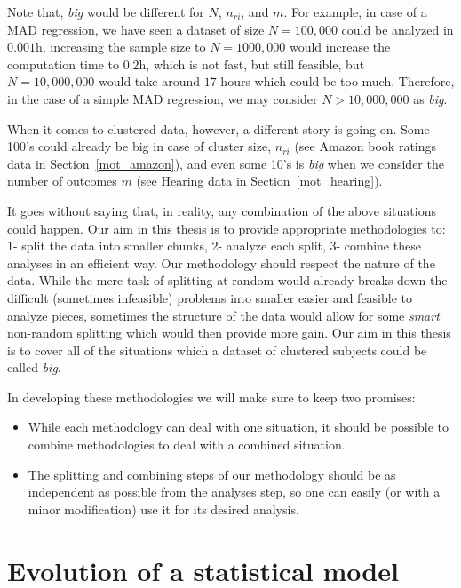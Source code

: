 \documentclass[11pt,a5paper,twoside]{book}
\begin{document}
Note that, \emph{big} would be different for $N$, $n_{ri}$, and $m$. For example, in case of a MAD regression, we have seen a dataset of size $N=100,000$ could be analyzed in $0.001$h, increasing the sample size to $N = 1000,000$ would increase the computation time to $0.2$h, which is not fast, but still feasible, but $N=10,000,000$ would take around $17$ hours which could be too much. Therefore, in the case of a simple MAD regression, we may consider $N>10,000,000$ as \emph{big}.

When it comes to clustered data, however, a different story is going on. Some 100's could already be big in case of cluster size, $n_{ri}$ (see Amazon book ratings data in Section~\ref{mot_amazon}), and even some 10's is \emph{big} when we consider the number of outcomes $m$ (see Hearing data in Section~\ref{mot_hearing}).

It goes without saying that, in reality, any combination of the above situations could happen. Our aim in this thesis is to provide appropriate methodologies to: 1- split the data into smaller chunks, 2- analyze each split, 3- combine these analyses in an efficient way. Our methodology should respect the nature of the data. While the mere task of splitting at random would already breaks down the difficult (sometimes infeasible) problems into smaller easier and feasible to analyze pieces, sometimes the structure of the data would allow for some \emph{smart} non-random splitting which would then provide more gain. Our aim in this thesis is to cover all of the situations which a dataset of clustered subjects could be called \emph{big}. 

In developing these methodologies we will make sure to keep two promises:

\begin{itemize}
\item While each methodology can deal with one situation, it should be possible to combine methodologies to deal with a combined situation.

\item The splitting and combining steps of our methodology should be as independent as possible from the analyses step, so one can easily (or with a minor modification) use it for its desired analysis.
 
\end{itemize}

\section{Evolution of a statistical model}
\end{document}
